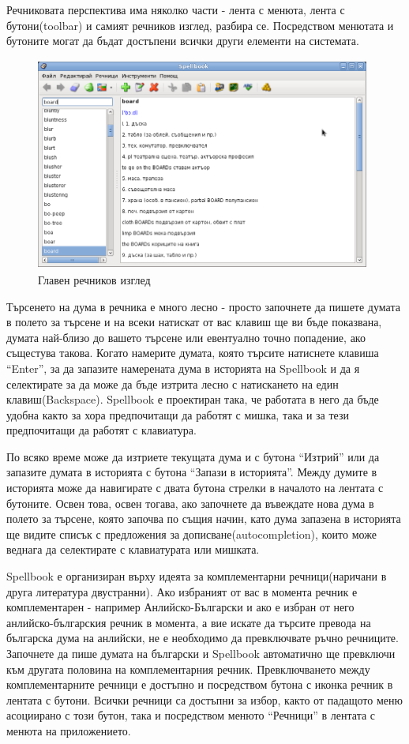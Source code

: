 Речниковата перспектива има няколко части - лента с менюта, лента с
бутони(toolbar) и самият речников изглед, разбира се. Посредством
менютата и бутоните могат да бъдат достъпени всички други елементи на системата.
\begin{figure}[htbp]
  \caption{Главен речников изглед}
  \centering
  \includegraphics[width=110mm, height=70mm]{images/dictionary_view.png}
\end{figure}

Търсенето на дума в речника е много лесно - просто започнете да пишете
думата в полето за търсене и на всеки натискат от вас клавиш ще ви
бъде показвана, думата най-близо до вашето търсене или евентуално
точно попадение, ако същестува такова. Когато намерите думата, която
търсите натиснете клавиша "`Enter"', за да запазите намерената дума в
историята на Spellbook и да я селектирате за да може да бъде изтрита
лесно с натискането на един клавиш(Backspace). Spellbook е проектиран
така, че работата в него да бъде удобна както за хора предпочитащи да
работят с мишка, така и за тези предпочитащи да работят с клавиатура.

По всяко време може да изтриете текущата дума и с бутона "`Изтрий"'
или да запазите думата в историята с бутона "`Запази в
историята"'. Между думите в историята може да навигирате с двата
бутона стрелки в началото на лентата с бутоните. Освен това, освен
тогава, ако започнете да въвеждате нова дума в полето за търсене,
която започва по същия начин, като дума запазена в историята ще видите
списък с предложения за дописване(autocompletion), които може веднага
да селектирате с клавиатурата или мишката.

Spellbook е организиран върху идеята за комплементарни
речници(наричани в друга литература двустранни). Ако избраният от вас
в момента речник е комплементарен - например Анлийско-Български и ако
е избран от него анлийско-българския речник в момента, а вие искате да
търсите превода на българска дума на анлийски, не е необходимо да
превключвате ръчно речниците. Започнете да пише думата на български и
Spellbook автоматично ще превключи към другата половина на
комплементарния речник. Превключването между комплементарните речници
е достъпно и посредством бутона с иконка речник в лентата с
бутони. Всички речници са достъпни за избор, както от падащото меню
асоциирано с този бутон, така и посредством менюто "`Речници"' в
лентата с менюта на приложението.

